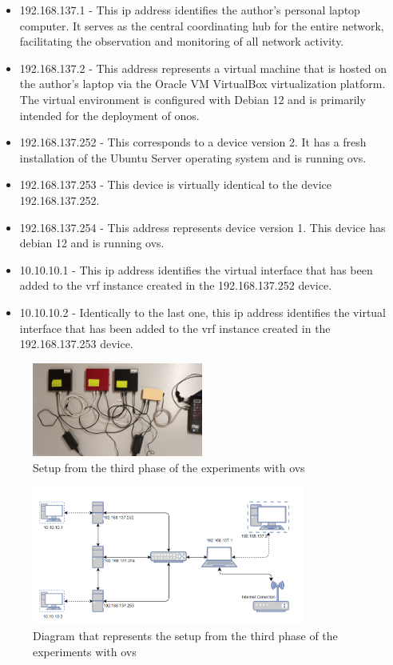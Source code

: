 \begin{itemize}
	\item 192.168.137.1 - This \gls{ip} address identifies the author's personal laptop computer. It serves as the central coordinating hub for the entire network, facilitating the observation and monitoring of all network activity.
	\item 192.168.137.2 - This address represents a virtual machine that is hosted on the author's laptop via the Oracle VM VirtualBox virtualization platform. The virtual environment is configured with Debian 12 and is primarily intended for the deployment of \gls{onos}.
	\item 192.168.137.252 - This corresponds to a device version 2. It has a fresh installation of the Ubuntu Server operating system and is running \gls{ovs}.
	\item 192.168.137.253 - This device is virtually identical to the device 192.168.137.252.
	\item 192.168.137.254 - This address represents device version 1. This device has debian 12 and is running \gls{ovs}.
	\item 10.10.10.1 - This \gls{ip} address identifies the virtual interface that has been added to the \gls{vrf} instance created in the 192.168.137.252 device.
	\item 10.10.10.2 - Identically to the last one, this \gls{ip} address identifies the virtual interface that has been added to the \gls{vrf} instance created in the 192.168.137.253 device.
\end{itemize}

\begin{figure}
	\centering
	\includegraphics[width=0.5\textwidth]{Chapters/Figures/tests/ovs_phase_3/setup.jpg}
	\caption{Setup from the third phase of the experiments with \gls{ovs}}
	\label{fig:exp1_phase3_setup}
\end{figure}

\begin{figure}
	\centering
	\includegraphics[width=0.8\textwidth]{Chapters/Figures/tests/ovs_phase_4/setup_diagram.PNG}
	\caption{Diagram that represents the setup from the third phase of the experiments with \gls{ovs}}
	\label{fig:exp1_phase4_diagram}
\end{figure}

